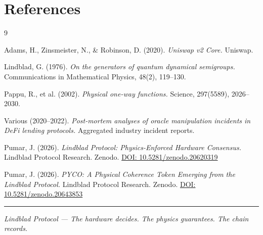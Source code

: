 \documentclass[11pt,a4paper]{article}
\begin{document}
\section*{References}

\begin{thebibliography}{9}

Adams, H., Zinsmeister, N., \& Robinson, D. (2020).
\textit{Uniswap v2 Core.}
Uniswap.

Lindblad, G. (1976).
\textit{On the generators of quantum dynamical semigroups.}
Communications in Mathematical Physics, 48(2), 119--130.

Pappu, R., et al. (2002).
\textit{Physical one-way functions.}
Science, 297(5589), 2026--2030.

Various (2020--2022).
\textit{Post-mortem analyses of oracle manipulation incidents in DeFi lending protocols.}
Aggregated industry incident reports.

Pumar, J. (2026).
\textit{Lindblad Protocol: Physics-Enforced Hardware Consensus.}
Lindblad Protocol Research.
Zenodo. \href{https://doi.org/10.5281/zenodo.20620319}{DOI: 10.5281/zenodo.20620319}

Pumar, J. (2026).
\textit{PYCO: A Physical Coherence Token Emerging from the Lindblad Protocol.}
Lindblad Protocol Research.
Zenodo. \href{https://doi.org/10.5281/zenodo.20643853}{DOI: 10.5281/zenodo.20643853}

\end{thebibliography}

\vspace{2em}
\hrule
\vspace{1em}
\noindent\small\textit{Lindblad Protocol --- The hardware decides. The physics guarantees. The chain records.}
\end{document}
